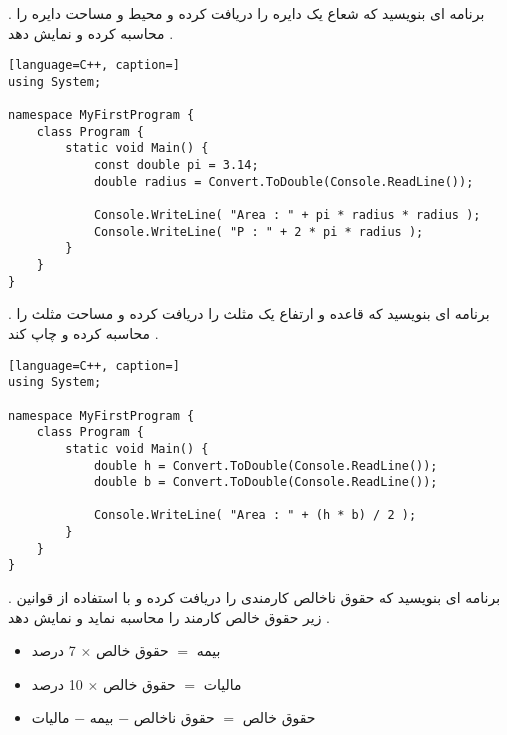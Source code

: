 \documentclass[12pt]{article}
\begin{document}
\newpage

 . برنامه ای بنویسید که شعاع یک دایره را دریافت کرده و محیط و مساحت دایره را محاسبه کرده و نمایش دهد .




\begin{latin}
\begin{lstlisting}[language=C++, caption=]
using System;

namespace MyFirstProgram {
	class Program {
		static void Main() {
			const double pi = 3.14;
			double radius = Convert.ToDouble(Console.ReadLine());
			
			Console.WriteLine( "Area : " + pi * radius * radius );
			Console.WriteLine( "P : " + 2 * pi * radius );
		}
	}
}
\end{lstlisting}
\end{latin}




 . برنامه ای بنویسید که قاعده و ارتفاع یک مثلث را دریافت کرده و مساحت مثلث را محاسبه کرده و چاپ کند .




\begin{latin}
\begin{lstlisting}[language=C++, caption=]
using System;

namespace MyFirstProgram {
	class Program {
		static void Main() {
			double h = Convert.ToDouble(Console.ReadLine());
			double b = Convert.ToDouble(Console.ReadLine());
			
			Console.WriteLine( "Area : " + (h * b) / 2 );
		}
	}
}
\end{lstlisting}
\end{latin}






\newpage

 . برنامه ای بنویسید که حقوق ناخالص کارمندی را دریافت کرده و با استفاده از قوانین زیر حقوق خالص کارمند را محاسبه نماید و نمایش دهد .

\begin{itemize}
	\item بیمه $=$ حقوق خالص 
	$\times$ 7 درصد
	\item مالیات $=$ حقوق خالص 
	$\times$ 10 درصد
	\item حقوق خالص $=$ حقوق ناخالص $-$ بیمه $-$ مالیات
\end{itemize}
\end{document}
